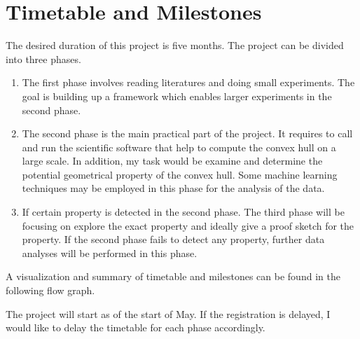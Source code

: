 \documentclass[12pt,letterpaper]{article}
\begin{document}
\section{Timetable and Milestones}
The desired duration of this project is five months. The project can be divided into three phases.
\begin{enumerate}
    \item The first phase involves reading literatures and doing small experiments. The goal is building up a framework which enables larger experiments in the second phase. 
    \item The second phase is the main practical part of the project. It requires to call and run the scientific software that help to compute the convex hull on a large scale. 
    In addition, my task would be examine and determine the potential geometrical property of the convex hull. Some machine learning techniques may be employed in this phase 
    for the analysis of the data.
    \item If certain property is detected in the second phase. The third phase will be focusing on explore the exact property and ideally give a proof sketch for the property. 
    If the second phase fails to detect any property, further data analyses will be performed in this phase. 
\end{enumerate}
A visualization and summary of timetable and milestones can be found in the following flow graph. 
\begin{figure}[H]
    \centering 
\end{figure}
The project will start as of the start of May. 
If the registration is delayed, I would like to delay the timetable for each phase accordingly.





\end{document}
